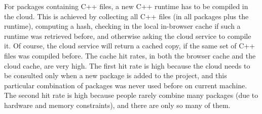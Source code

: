 For packages containing C++ files, a new C++ runtime has to be compiled in the cloud.
This is achieved by collecting all C++ files (in all packages plus the \CO runtime),
computing a hash, checking in the local in-browser cache if such a runtime was retrieved
before, and otherwise asking the cloud service to compile it.
Of course, the cloud service will return a cached copy, if the same set of C++
files was compiled before. The cache hit rates, in both the browser cache
and the cloud cache, are very high. 
The first hit rate is high because the cloud needs to be consulted
only when a new package is added to the project, and this particular combination 
of packages was never used before on current machine.
The second hit rate is high because people rarely combine many packages (due to
hardware and memory constraints), and there are only so many of them.
